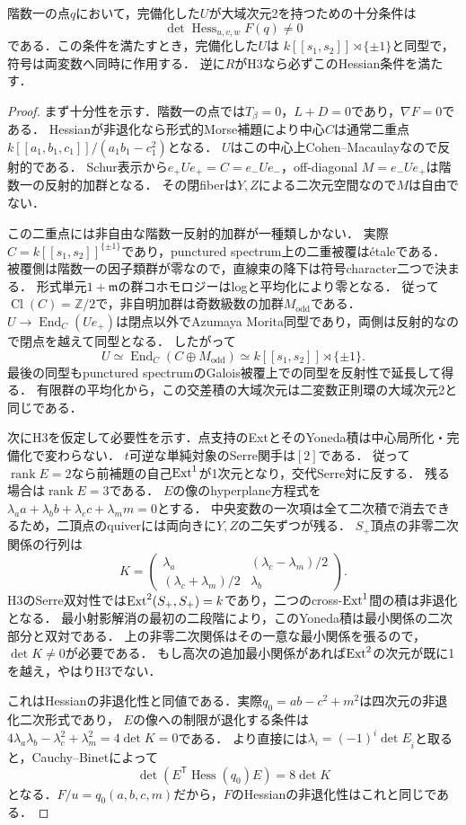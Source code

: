 \begin{lemma}[階数一での正確な局所homological判定]
\label{lem:beta-node-equivalence}
階数一の点$q$において，完備化した$U$が大域次元2を持つための十分条件は
\[
 \det\operatorname{Hess}_{u,v,w}F(q)\ne0
\]
である．この条件を満たすとき，完備化した$U$は
$k[[s_1,s_2]]\rtimes\{\pm1\}$と同型で，符号は両変数へ同時に作用する．
逆に$R$がH3なら必ずこのHessian条件を満たす．
\end{lemma}
\begin{proof}
まず十分性を示す．階数一の点では$T_\beta=0$，$L+D=0$であり，$\nabla F=0$である．
Hessianが非退化なら形式的Morse補題により中心$C$は通常二重点
$k[[a_1,b_1,c_1]]/(a_1b_1-c_1^2)$となる．
$U$はこの中心上Cohen--Macaulayなので反射的である．
Schur表示から$e_+Ue_+=C=e_-Ue_-$，off-diagonal $M=e_-Ue_+$は階数一の反射的加群となる．
その閉fiberは$Y,Z$による二次元空間なので$M$は自由でない．

この二重点には非自由な階数一反射的加群が一種類しかない．
実際$C=k[[s_1,s_2]]^{\{\pm1\}}$であり，punctured spectrum上の二重被覆は\'{e}taleである．
被覆側は階数一の因子類群が零なので，直線束の降下は符号character二つで決まる．
形式単元$1+\mathfrak m$の群コホモロジーはlogと平均化により零となる．
従って$\operatorname{Cl}(C)=\mathbb Z/2$で，非自明加群は奇数級数の加群$M_{\mathrm{odd}}$である．
$U\to\operatorname{End}_C(Ue_+)$は閉点以外でAzumaya Morita同型であり，両側は反射的なので閉点を越えて同型となる．
したがって
\[
 U\simeq\operatorname{End}_C(C\oplus M_{\mathrm{odd}})
 \simeq k[[s_1,s_2]]\rtimes\{\pm1\}.
\]
最後の同型もpunctured spectrumのGalois被覆上での同型を反射性で延長して得る．
有限群の平均化から，この交差積の大域次元は二変数正則環の大域次元2と同じである．

次にH3を仮定して必要性を示す．点支持のExtとそのYoneda積は中心局所化・完備化で変わらない．
$t$可逆な単純対象のSerre関手は$[2]$である．
従って$\operatorname{rank}E=2$なら前補題の自己$\operatorname{Ext}^1$が1次元となり，交代Serre対に反する．
残る場合は$\operatorname{rank}E=3$である．
$E$の像のhyperplane方程式を
$\lambda_a a+\lambda_b b+\lambda_c c+\lambda_m m=0$とする．
中央変数の一次項は全て二次積で消去できるため，二頂点のquiverには両向きに$Y,Z$の二矢ずつが残る．
$S_+$頂点の非零二次関係の行列は
\[
 K=\begin{pmatrix}
 \lambda_a&(\lambda_c-\lambda_m)/2\\
 (\lambda_c+\lambda_m)/2&\lambda_b
 \end{pmatrix}.
\]
H3のSerre双対性では$\operatorname{Ext}^2(S_+,S_+)=k$であり，二つのcross-$\operatorname{Ext}^1$間の積は非退化となる．
最小射影解消の最初の二段階により，このYoneda積は最小関係の二次部分と双対である．
上の非零二次関係はその一意な最小関係を張るので，$\det K\ne0$が必要である．
もし高次の追加最小関係があれば$\operatorname{Ext}^2$の次元が既に1を越え，やはりH3でない．

これはHessianの非退化性と同値である．実際$q_0=ab-c^2+m^2$は四次元の非退化二次形式であり，
$E$の像への制限が退化する条件は
$4\lambda_a\lambda_b-\lambda_c^2+\lambda_m^2=4\det K=0$である．
より直接には$\lambda_i=(-1)^i\det E_{\widehat i}$と取ると，Cauchy--Binetによって
\[
 \det(E^{\mathsf T}\operatorname{Hess}(q_0)E)=8\det K
\]
となる．$F/u=q_0(a,b,c,m)$だから，$F$のHessianの非退化性はこれと同じである．
\end{proof}

